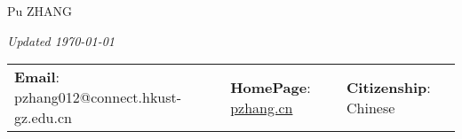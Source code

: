 \documentclass[letterpaper, 11pt]{article}
\begin{document}
\begin{center}
    \Huge Pu ZHANG
\end{center}
\hfill{\it\footnotesize Updated \today}


\vspace{0cm} 
\begin{center}
\begin{tabular}{lll}
\textbf{Email}: pzhang012@connect.hkust-gz.edu.cn     &
\hspace{0.1in} \textbf{HomePage}: \href{https://pzhang.cn}{pzhang.cn}    &

\hspace{0.1in} \textbf{Citizenship}: Chinese 
\end{tabular}
\end{center}


\setlength{\tabcolsep}{8pt}
\end{document}
